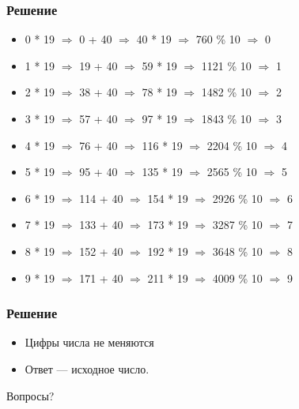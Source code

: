 \begin{frame}
    \frametitle{Решение}

    \begin{itemize}
        \item 0 * 19 $\Rightarrow$ 0 + 40 $\Rightarrow$ 40 * 19 $\Rightarrow$ 760 \% 10 $\Rightarrow$ 0
        \item 1 * 19 $\Rightarrow$ 19 + 40 $\Rightarrow$ 59 * 19 $\Rightarrow$ 1121 \% 10 $\Rightarrow$ 1
        \item 2 * 19 $\Rightarrow$ 38 + 40 $\Rightarrow$ 78 * 19 $\Rightarrow$ 1482 \% 10 $\Rightarrow$ 2
        \item 3 * 19 $\Rightarrow$ 57 + 40 $\Rightarrow$ 97 * 19 $\Rightarrow$ 1843 \% 10 $\Rightarrow$ 3
        \item 4 * 19 $\Rightarrow$ 76 + 40 $\Rightarrow$ 116 * 19 $\Rightarrow$ 2204 \% 10 $\Rightarrow$ 4
        \item 5 * 19 $\Rightarrow$ 95 + 40 $\Rightarrow$ 135 * 19 $\Rightarrow$ 2565 \% 10 $\Rightarrow$ 5
        \item 6 * 19 $\Rightarrow$ 114 + 40 $\Rightarrow$ 154 * 19 $\Rightarrow$ 2926 \% 10 $\Rightarrow$ 6
        \item 7 * 19 $\Rightarrow$ 133 + 40 $\Rightarrow$ 173 * 19 $\Rightarrow$ 3287 \% 10 $\Rightarrow$ 7
        \item 8 * 19 $\Rightarrow$ 152 + 40 $\Rightarrow$ 192 * 19 $\Rightarrow$ 3648 \% 10 $\Rightarrow$ 8
        \item 9 * 19 $\Rightarrow$ 171 + 40 $\Rightarrow$ 211 * 19 $\Rightarrow$ 4009 \% 10 $\Rightarrow$ 9
    \end{itemize}
\end{frame}

\begin{frame}
    \frametitle{Решение}

    \begin{itemize}
        \item Цифры числа не меняются
        \item Ответ --- исходное число.
    \end{itemize}
\end{frame}

\begin{frame}
    \begin{center}
        \Huge Вопросы?
    \end{center}
\end{frame}

